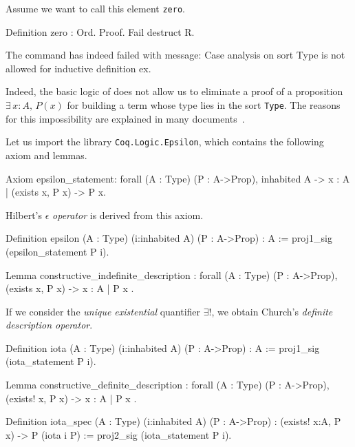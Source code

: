 Assume we want to call this element  \texttt{zero}.



\begin{Coqsrc}
Definition zero : Ord.
Proof.
  Fail destruct R.
\end{Coqsrc}

\begin{Coqanswer}
The command has indeed failed with message:
Case analysis on sort Type is not allowed for inductive 
definition ex.
\end{Coqanswer}


Indeed, the basic logic of  \coq{} does not allow us to eliminate a proof of a proposition 
$\exists\,x:A,\,P(x)$ for building a term whose type lies in the sort \texttt{Type}. 
The reasons for this impossibility are explained in many documents~\cite{BC04, chlipalacpdt2011, Coq}.

Let us import the library \texttt{Coq.Logic.Epsilon}, which contains the following axiom and lemmas.


\begin{Coqsrc}
Axiom epsilon_statement:
  forall (A : Type) (P : A->Prop), inhabited A ->
    {x : A | (exists x, P x) -> P x}.
\end{Coqsrc}

Hilbert's $\epsilon$ \emph{operator} is derived from this  axiom.

\begin{Coqsrc}
  Definition epsilon (A : Type) (i:inhabited A) (P : A->Prop) : A
  := proj1_sig (epsilon_statement P i).

Lemma constructive_indefinite_description :
  forall (A : Type) (P : A->Prop),
    (exists x, P x) -> { x : A | P x }.
\end{Coqsrc}




If we consider the \emph{unique existential} quantifier $\exists!$, we obtain
Church's \emph{definite description operator}.

\begin{Coqsrc}
Definition iota (A : Type) (i:inhabited A) (P : A->Prop) : A
  := proj1_sig (iota_statement P i).
\end{Coqsrc}


\begin{Coqsrc}
 Lemma constructive_definite_description :
  forall (A : Type) (P : A->Prop),
    (exists! x, P x) -> { x : A | P x }.
\end{Coqsrc}


\begin{Coqsrc}
Definition iota_spec (A : Type) (i:inhabited A) (P : A->Prop) :
  (exists! x:A, P x) -> P (iota i P)
  := proj2_sig (iota_statement P i).
\end{Coqsrc}



